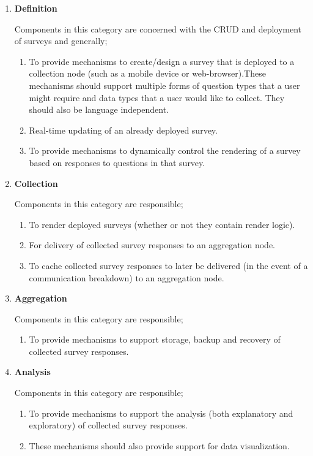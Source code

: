 \documentclass[a4paper,12pt]{article}
\begin{document}
\begin{enumerate}[label=(\arabic*)]
\item \textbf{Definition}\par
Components in this category are concerned with the CRUD and deployment of surveys and generally;
\begin{enumerate}[label=(\roman*)]
\item To provide mechanisms to create/design a survey that is deployed to a collection node (such as a mobile device or web-browser).These mechanisms should support multiple forms of question types that a user might require and data types that a user would like to collect. They should also be language independent.
\item Real-time updating of an already deployed survey.

\item To provide mechanisms to dynamically control the rendering of a survey based on
responses to questions in that survey.
\end{enumerate}

\item \textbf{Collection}\par
Components in this category are responsible;
\begin{enumerate}[label=(\roman*)]
\item To render deployed surveys (whether or not they contain render logic).
\item For delivery of collected survey responses to an aggregation node.

\item To cache collected survey responses to later be delivered (in the event of a communication breakdown) to an aggregation node.
\end{enumerate}

\item \textbf{Aggregation}\par
Components in this category are responsible;
\begin{enumerate}[label=(\roman*)]
\item To provide mechanisms to support storage, backup and recovery of collected survey
responses.
\end{enumerate}
\item \textbf{Analysis}\par
Components in this category are responsible;
\begin{enumerate}[label=(\roman*)]
\item To provide mechanisms to support the analysis (both explanatory and exploratory)
of collected survey responses.
\item These mechanisms should also provide support for data visualization.
\end{enumerate}

\end{enumerate}
\end{document}
